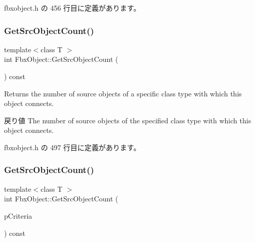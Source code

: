  fbxobject.\+h の 456 行目に定義があります。

\mbox{\label{class_fbx_object_a9da9f905564dc108d1363049eb032fa8}} 
\subsubsection{\texorpdfstring{Get\+Src\+Object\+Count()}{GetSrcObjectCount()}\hspace{0.1cm}{\footnotesize\ttfamily [3/4]}}
{\footnotesize\ttfamily template$<$class T $>$ \\
int Fbx\+Object\+::\+Get\+Src\+Object\+Count (\begin{DoxyParamCaption}{ }\end{DoxyParamCaption}) const\hspace{0.3cm}{\ttfamily [inline]}}

Returns the number of source objects of a specific class type with which this object connects. \begin{DoxyReturn}{戻り値}
The number of source objects of the specified class type with which this object connects. 
\end{DoxyReturn}


 fbxobject.\+h の 497 行目に定義があります。

\mbox{\label{class_fbx_object_aabefdc2922a216fb7a1ce864fcf2438a}} 
\subsubsection{\texorpdfstring{Get\+Src\+Object\+Count()}{GetSrcObjectCount()}\hspace{0.1cm}{\footnotesize\ttfamily [4/4]}}
{\footnotesize\ttfamily template$<$class T $>$ \\
int Fbx\+Object\+::\+Get\+Src\+Object\+Count (\begin{DoxyParamCaption}\item[{const \hyperlink{class_fbx_criteria}{Fbx\+Criteria} \&}]{p\+Criteria }\end{DoxyParamCaption}) const\hspace{0.3cm}{\ttfamily [inline]}}

